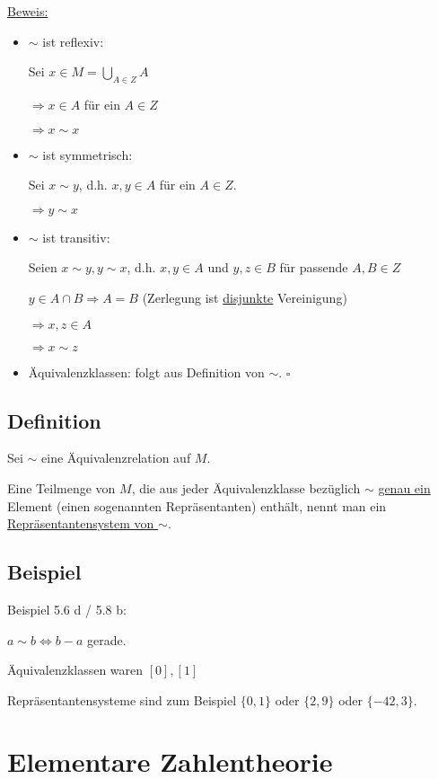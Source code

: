 \documentclass[a4paper, 12pt, twoside] {article}
\begin{document}
\underline{Beweis:} 
\begin{itemize}
\item $\sim$ ist reflexiv:

Sei $x \in M = \displaystyle\bigcup_{A \in Z} A$

$\Rightarrow x \in A$ für ein $A \in Z$

$\Rightarrow x \sim x$

\item $\sim$ ist symmetrisch:

Sei $x \sim y$, d.h. $x,y \in A$ für ein $A \in Z$.

$\Rightarrow y \sim x$

\item $\sim$ ist transitiv:

Seien $x \sim y, y \sim x$, d.h. $x,y \in A$ und $y,z \in B$ für passende $A,B \in Z$

$y \in A \cap B \Rightarrow A = B$ (Zerlegung ist \underline{disjunkte} Vereinigung)

$\Rightarrow x,z \in A$

$\Rightarrow x \sim z$

\item Äquivalenzklassen: folgt aus Definition von $\sim$. \hfill $\square$
\end{itemize}

\subsection{Definition}

Sei $\sim$ eine Äquivalenzrelation auf $M$.

Eine Teilmenge von $M$, die aus jeder Äquivalenzklasse bezüglich $\sim$ \underline{genau ein} Element (einen sogenannten Repräsentanten) enthält, nennt man ein \underline{Repräsentantensystem von $\sim$}.

\subsection{Beispiel}

Beispiel 5.6 d / 5.8 b:

$a \sim b \Leftrightarrow b-a$ gerade.

Äquivalenzklassen waren $[0],[1]$

Repräsentantensysteme sind zum Beispiel $\{0,1\}$ oder $\{2,9\}$ oder $\{-42,3\}$.

\section{Elementare Zahlentheorie}
\end{document}
